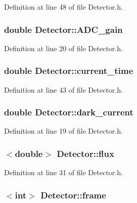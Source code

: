 Definition at line 48 of file Detector.h.

\hypertarget{classDetector_adb18913ba2480228ee13611040ad7bfe}{
\subsubsection[{ADC\_\-gain}]{\setlength{\rightskip}{0pt plus 5cm}double {\bf Detector::ADC\_\-gain}}}
\label{classDetector_adb18913ba2480228ee13611040ad7bfe}


Definition at line 20 of file Detector.h.

\hypertarget{classDetector_a7d1a73b930a0cdc646e9d5e7a75f28e7}{
\subsubsection[{current\_\-time}]{\setlength{\rightskip}{0pt plus 5cm}double {\bf Detector::current\_\-time}}}
\label{classDetector_a7d1a73b930a0cdc646e9d5e7a75f28e7}


Definition at line 43 of file Detector.h.

\hypertarget{classDetector_a8c0b7234e4b96407d8648a42efec4371}{
\subsubsection[{dark\_\-current}]{\setlength{\rightskip}{0pt plus 5cm}double {\bf Detector::dark\_\-current}}}
\label{classDetector_a8c0b7234e4b96407d8648a42efec4371}


Definition at line 19 of file Detector.h.

\hypertarget{classDetector_ac6809aa9b8d5acee17ce16353599d557}{
\subsubsection[{flux}]{$<$double$>$ {\bf Detector::flux}}}
\label{classDetector_ac6809aa9b8d5acee17ce16353599d557}


Definition at line 31 of file Detector.h.

\hypertarget{classDetector_a5082e9a99cae04f03cba0223a0593053}{
\subsubsection[{frame}]{$<$int$>$ {\bf Detector::frame}}}
\label{classDetector_a5082e9a99cae04f03cba0223a0593053}


